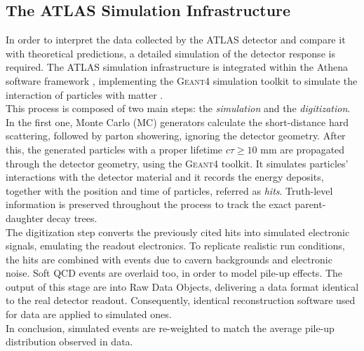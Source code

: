 \subsection{The ATLAS Simulation Infrastructure}\label{sec:LHCAtlas/ATLAS/Simulation}

In order to interpret the data collected by the ATLAS detector and compare it with theoretical predictions, a detailed simulation of the detector response is required.
The ATLAS simulation infrastructure is integrated within the Athena software framework \cite{ATLAS_Computing}, implementing the G\textsc{eant}4 simulation toolkit to simulate the interaction of particles with matter \cite{Geant4}. \\
This process is composed of two main steps: the \textit{simulation} and the \textit{digitization}.
In the first one, Monte Carlo (MC) generators calculate the short-distance hard scattering, followed by parton showering, ignoring the detector geometry.
After this, the generated particles with a proper lifetime $c\tau \ge 10\text{ mm}$ are propagated through the detector geometry, using the G\textsc{eant}4 toolkit. 
It simulates particles' interactions with the detector material and it records the energy deposits, together with the position and time of particles, referred as \textit{hits}.
Truth-level information is preserved throughout the process to track the exact parent-daughter decay trees.\\
The digitization step converts the previously cited hits into simulated electronic signals, emulating the readout electronics.
To replicate realistic run conditions, the hits are combined with events due to cavern backgrounds and electronic noise. 
Soft QCD events are overlaid too, in order to model pile-up effects. 
The output of this stage are into Raw Data Objects, delivering a data format identical to the real detector readout. 
Consequently, identical reconstruction software used for data are applied to simulated ones.\\ 
In conclusion, simulated events are re-weighted to match the average pile-up distribution observed in data.



